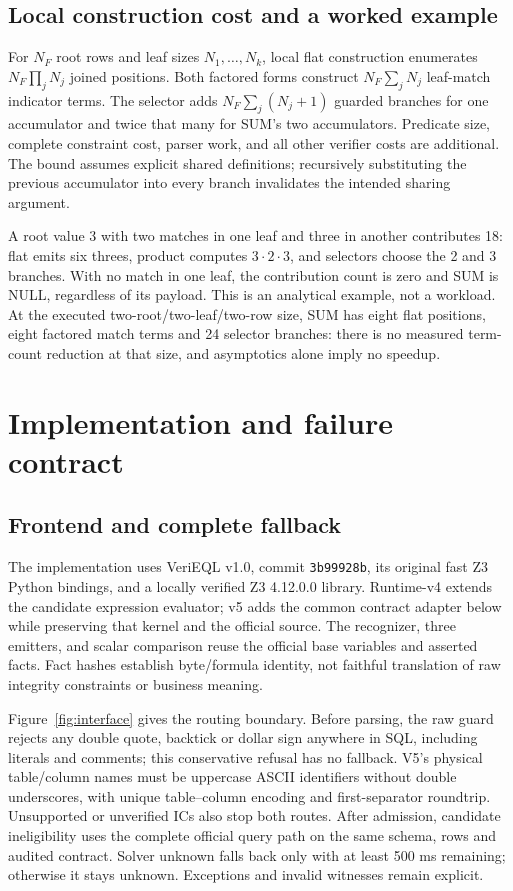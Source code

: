 \documentclass[3p,times,authoryear]{elsarticle}
\begin{document}
\subsection{Local construction cost and a worked example}
For $N_F$ root rows and leaf sizes $N_1,\ldots,N_k$, local flat construction enumerates $N_F\prod_jN_j$ joined positions. Both factored forms construct $N_F\sum_jN_j$ leaf-match indicator terms. The selector adds $N_F\sum_j(N_j+1)$ guarded branches for one accumulator and twice that many for SUM's two accumulators. Predicate size, complete constraint cost, parser work, and all other verifier costs are additional. The bound assumes explicit shared definitions; recursively substituting the previous accumulator into every branch invalidates the intended sharing argument.

A root value 3 with two matches in one leaf and three in another contributes 18: flat emits six threes, product computes $3\cdot2\cdot3$, and selectors choose the 2 and 3 branches. With no match in one leaf, the contribution count is zero and SUM is NULL, regardless of its payload. This is an analytical example, not a workload. At the executed two-root/two-leaf/two-row size, SUM has eight flat positions, eight factored match terms and 24 selector branches: there is no measured term-count reduction at that size, and asymptotics alone imply no speedup.

\section{Implementation and failure contract}\label{sec:system}
\subsection{Frontend and complete fallback}
The implementation uses VeriEQL v1.0, commit \texttt{3b99928b}, its original fast Z3 Python bindings, and a locally verified Z3 4.12.0.0 library. Runtime-v4 extends the candidate expression evaluator; v5 adds the common contract adapter below while preserving that kernel and the official source. The recognizer, three emitters, and scalar comparison reuse the official base variables and asserted facts. Fact hashes establish byte/formula identity, not faithful translation of raw integrity constraints or business meaning.

Figure~\ref{fig:interface} gives the routing boundary. Before parsing, the raw guard rejects any double quote, backtick or dollar sign anywhere in SQL, including literals and comments; this conservative refusal has no fallback. V5's physical table/column names must be uppercase ASCII identifiers without double underscores, with unique table--column encoding and first-separator roundtrip. Unsupported or unverified ICs also stop both routes. After admission, candidate ineligibility uses the complete official query path on the same schema, rows and audited contract. Solver unknown falls back only with at least 500 ms remaining; otherwise it stays unknown. Exceptions and invalid witnesses remain explicit.
\end{document}
